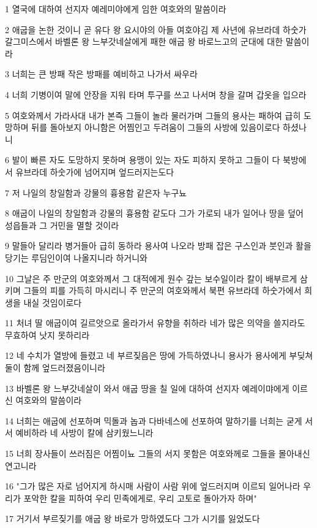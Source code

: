 \par 1 열국에 대하여 선지자 예레미야에게 임한 여호와의 말씀이라
\par 2 애굽을 논한 것이니 곧 유다 왕 요시야의 아들 여호야김 제 사년에 유브라데 하숫가 갈그미스에서 바벨론 왕 느부갓네살에게 패한 애굽 왕 바로느고의 군대에 대한 말씀이라
\par 3 너희는 큰 방패 작은 방패를 예비하고 나가서 싸우라
\par 4 너희 기병이여 말에 안장을 지워 타며 투구를 쓰고 나서며 창을 갈며 갑옷을 입으라
\par 5 여호와께서 가라사대 내가 본즉 그들이 놀라 물러가며 그들의 용사는 패하여 급히 도망하며 뒤를 돌아보지 아니함은 어찜인고 두려움이 그들의 사방에 있음이로다 하셨나니
\par 6 발이 빠른 자도 도망하지 못하며 용맹이 있는 자도 피하지 못하고 그들이 다 북방에서 유브라데 하숫가에 넘어지며 엎드러지는도다
\par 7 저 나일의 창일함과 강물의 흉용함 같은자 누구뇨
\par 8 애굽이 나일의 창일함과 강물의 흉용함 같도다 그가 가로되 내가 일어나 땅을 덮어 성읍들과 그 거민을 멸할 것이라
\par 9 말들아 달리라 병거들아 급히 동하라 용사여 나오라 방패 잡은 구스인과 붓인과 활을 당기는 루딤인이여 나올지니라 하거니와
\par 10 그날은 주 만군의 여호와께서 그 대적에게 원수 갚는 보수일이라 칼이 배부르게 삼키며 그들의 피를 가득히 마시리니 주 만군의 여호와께서 북편 유브라데 하숫가에서 희생을 내실 것임이로다
\par 11 처녀 딸 애굽이여 길르앗으로 올라가서 유향을 취하라 네가 많은 의약을 쓸지라도 무효하여 낫지 못하리라
\par 12 네 수치가 열방에 들렸고 네 부르짖음은 땅에 가득하였나니 용사가 용사에게 부딪쳐 둘이 함께 엎드러졌음이니라
\par 13 바벨론 왕 느부갓네살이 와서 애굽 땅을 칠 일에 대하여 선지자 예레이먀에게 이르신 여호와의 말씀이라
\par 14 너희는 애굽에 선포하며 믹돌과 놉과 다바네스에 선포하여 말하기를 너희는 굳게 서서 예비하라 네 사방이 칼에 삼키웠느니라
\par 15 너희 장사들이 쓰러짐은 어찜이뇨 그들의 서지 못함은 여호와께로 그들을 몰아내신 연고니라
\par 16 "그가 많은 자로 넘어지게 하시매 사람이 사람 위에 엎드러지며 이르되 일어나라 우리가 포악한 칼을 피하여 우리 민족에게로, 우리 고토로 돌아가자 하며"
\par 17 거기서 부르짖기를 애굽 왕 바로가 망하였도다 그가 시기를 잃었도다
